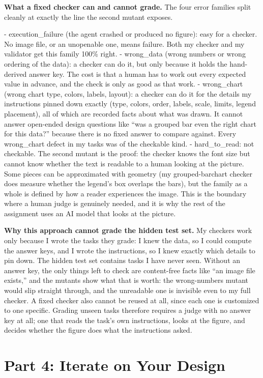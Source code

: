 \documentclass[11pt]{article}
\begin{document}
\textbf{What a fixed checker can and cannot grade.} The four error families split cleanly at exactly the line the second mutant exposes.

- execution\_failure (the agent crashed or produced no figure): easy for a checker. No image file, or an unopenable one, means failure. Both my checker and my validator get this family 100\% right.
- wrong\_data (wrong numbers or wrong ordering of the data): a checker can do it, but only because it holds the hand-derived answer key. The cost is that a human has to work out every expected value in advance, and the check is only as good as that work.
- wrong\_chart (wrong chart type, colors, labels, layout): a checker can do it for the details my instructions pinned down exactly (type, colors, order, labels, scale, limits, legend placement), all of which are recorded facts about what was drawn. It cannot answer open-ended design questions like ``was a grouped bar even the right chart for this data?'' because there is no fixed answer to compare against. Every wrong\_chart defect in my tasks was of the checkable kind.
- hard\_to\_read: not checkable. The second mutant is the proof: the checker knows the font size but cannot know whether the text is readable to a human looking at the picture. Some pieces can be approximated with geometry (my grouped-barchart checker does measure whether the legend's box overlaps the bars), but the family as a whole is defined by how a reader experiences the image. This is the boundary where a human judge is genuinely needed, and it is why the rest of the assignment uses an AI model that looks at the picture.

\textbf{Why this approach cannot grade the hidden test set.} My checkers work only because I wrote the tasks they grade: I knew the data, so I could compute the answer keys, and I wrote the instructions, so I knew exactly which details to pin down. The hidden test set contains tasks I have never seen. Without an answer key, the only things left to check are content-free facts like ``an image file exists,'' and the mutants show what that is worth: the wrong-numbers mutant would slip straight through, and the unreadable one is invisible even to my full checker. A fixed checker also cannot be reused at all, since each one is customized to one specific. Grading unseen tasks therefore requires a judge with no answer key at all; one that reads the task's own instructions, looks at the figure, and decides whether the figure does what the instructions asked.

\section{Part 4: Iterate on Your Design}
\end{document}
